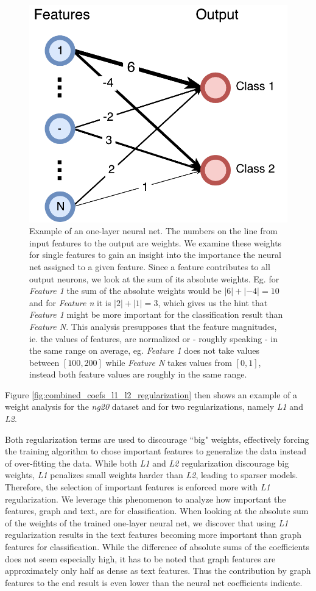 \begin{figure}[htb!]
	\centering
	{\includegraphics[width=0.5\linewidth]{assets/figures/coefs_example.pdf}%
		\caption{%
			Example of an one-layer neural net. The numbers on the line from input features to the output are weights.
			We examine these weights for single features to gain an insight into the importance the neural net assigned to a given feature. Since a feature contributes to all output neurons, we look at the sum of its absolute weights. Eg. for \textit{Feature 1} the sum of the absolute weights would be $|6| + |-4| = 10$ and for \textit{Feature n} it is $|2| + |1| = 3$, which gives us the hint that \textit{Feature 1} might be more important for the classification result than \textit{Feature N}.
			This analysis presupposes that the feature magnitudes, ie. the values of features, are normalized or - roughly speaking - in the same range on average, eg. \textit{Feature 1} does not take values between $[100, 200]$ while \textit{Feature N} takes values from $[0, 1]$, instead both feature values are roughly in the same range.
		}%
		\label{fig:coefs_example_one_layer}}
\end{figure}

Figure \ref{fig:combined_coefs_l1_l2_regularization} then shows an example of a weight analysis for the \textit{ng20} dataset and for two regularizations, namely \textit{L1} and \textit{L2}.

Both regularization terms are used to discourage ``big" weights, effectively forcing the training algorithm to chose important features to generalize the data instead of over-fitting the data.
While both \textit{L1} and \textit{L2} regularization discourage big weights, \textit{L1} penalizes small weights harder than \textit{L2}, leading to sparser models.
Therefore, the selection of important features is enforced more with \textit{L1} regularization.
We leverage this phenomenon to analyze how important the features, graph and text, are for classification.
When looking at the absolute sum of the weights of the trained one-layer neural net, we discover that using \textit{L1} regularization results in the text features becoming more important than graph features for classification.
While the difference of absolute sums of the coefficients does not seem especially high, it has to be noted that graph features are approximately only half as dense as text features.
Thus the contribution by graph features to the end result is even lower than the neural net coefficients indicate.

